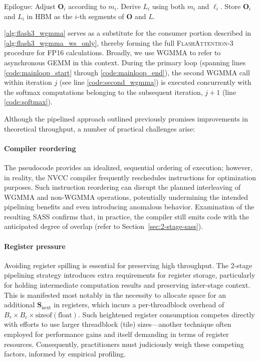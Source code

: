 \begin{algorithm}[H]
\begin{algorithmic}[1]
\STATE Epilogue: Adjust $\mathbf{O}_{i}$ according to $m_{i}$. Derive $L_{i}$ using both $m_{i}$ and $\ell_{i}$.  
Store $\mathbf{O}_{i}$ and $L_{i}$ in HBM as the $i$-th segments of $\mathbf{O}$ and $L$.

\cref{alg:flash3_wgmma} serves as a substitute for the consumer portion described in \cref{alg:flash3_wgmma_ws_only}, thereby forming the full \textsc{FlashAttention-3} procedure for FP16 calculations. Broadly, we use WGMMA to refer to asynchronous GEMM in this context. During the primary loop (spanning lines \ref{code:mainloop_start} through \ref{code:mainloop_end}), the second WGMMA call within iteration $j$ (see line \ref{code:second_wgmma}) is executed concurrently with the softmax computations belonging to the subsequent iteration, $j+1$ (line \ref{code:softmax}).

Although the pipelined approach outlined previously promises improvements in theoretical throughput, a number of practical challenges arise:

\paragraph{Compiler reordering} The pseudocode provides an idealized, sequential ordering of execution; however, in reality, the NVCC compiler frequently reschedules instructions for optimization purposes. Such instruction reordering can disrupt the planned interleaving of WGMMA and non-WGMMA operations, potentially undermining the intended pipelining benefits and even introducing anomalous behavior. Examination of the resulting SASS confirms that, in practice, the compiler still emits code with the anticipated degree of overlap (refer to Section~\ref{sec:2-stage-sass}).

\paragraph{Register pressure} Avoiding register spilling is essential for preserving high throughput. The 2-stage pipelining strategy introduces extra requirements for register storage, particularly for holding intermediate computation results and preserving inter-stage context. This is manifested most notably in the necessity to allocate space for an additional $\mathbf{S}_{\mathrm{next}}$ in registers, which incurs a per-threadblock overhead of $B_r \times B_c \times \text{sizeof}(\text{float})$. Such heightened register consumption competes directly with efforts to use larger threadblock (tile) sizes—another technique often employed for performance gains and itself demanding in terms of register resources. Consequently, practitioners must judiciously weigh these competing factors, informed by empirical profiling.


\end{algorithmic}
\end{algorithm}
